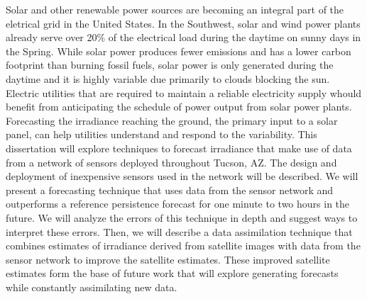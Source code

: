 Solar and other renewable power sources are becoming an integral part
of the eletrical grid in the United States.
In the Southwest, solar and wind power plants already serve over 20\%
of the electrical load during the daytime on sunny days in the Spring.
While solar power produces fewer emissions and has a lower carbon
footprint than burning fossil fuels, solar power is only generated
during the daytime and it is highly variable due primarily to clouds
blocking the sun.
Electric utilities that are required to maintain a reliable
electricity supply whould benefit from anticipating the schedule of
power output from solar power plants.
Forecasting the irradiance reaching the ground, the primary input to a
solar panel, can help utilities understand and respond to the
variability.
This dissertation will explore techniques to forecast irradiance that
make use of data from a network of sensors deployed throughout Tucson,
AZ.
The design and deployment of inexpensive sensors used in the network
will be described.
We will present a forecasting technique that uses data from the
sensor network and outperforms a reference persistence forecast for
one minute to two hours in the future.
We will analyze the errors of this technique in depth and suggest ways
to interpret these errors.
Then, we will describe a data assimilation technique that combines
estimates of irradiance derived from satellite images with data from
the sensor network to improve the satellite estimates.
These improved satellite estimates form the base of future work that will
explore generating forecasts while constantly assimilating new data.


